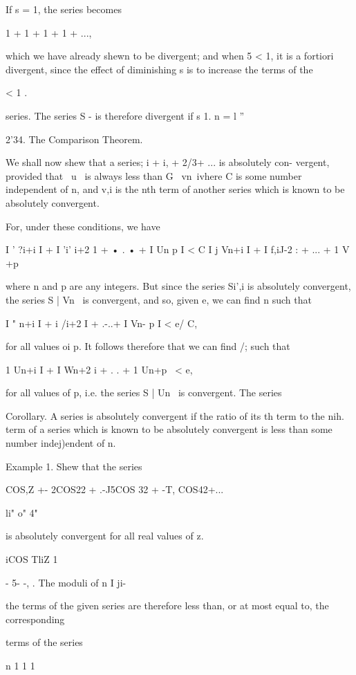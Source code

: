 If s = 1, the series becomes

1 + 1 + 1 + 1 + ...,

which we have already shewn to be divergent; and when 5 < 1, it is a
fortiori divergent, since the effect of diminishing s is to increase
the terms of the

< 1 .

series. The series S - is therefore divergent if s 1. n = l ''

2'34. The Comparison Theorem.

We shall now shew that a series; i + i, + 2/3+ ... is absolutely
con- vergent, provided that \ u \ is always less than G \ vn\, ivhere
C is some number independent of n, and v,i is the nth term of another
series which is known to be absolutely convergent.

For, under these conditions, we have

I ' ?i+i I + I 'i' i+2 1 + • . • + I Un p I < C I j Vn+i I + I f,iJ-2
: + ... + 1 V +p \ \,

where n and p are any integers. But since the series Si',i is
absolutely convergent, the series S | Vn \ is convergent, and so,
given e, we can find n such that

I " n+i I + i /i+2 I + .-..+ I Vn- p I < e/ C,

for all values oi p. It follows therefore that we can find /; such
that

1 Un+i I + I Wn+2 i + . . + 1 Un+p \ < e,

for all values of p, i.e. the series S | Un \ is convergent. The
series %

Corollary. A series is absolutely convergent if the ratio of its th
term to the nih. term of a series which is known to be absolutely
convergent is less than some number indej)endent of n.

Example 1. Shew that the series

COS,Z +- 2COS22 + .-J5COS 32 + -T, COS42+...

li" o" 4"

is absolutely convergent for all real values of z.

iCOS TliZ 1

- 5- -, . The moduli of n I ji-

the terms of the given series are therefore less than, or at most
equal to, the corresponding

terms of the series

n 1 1 1

